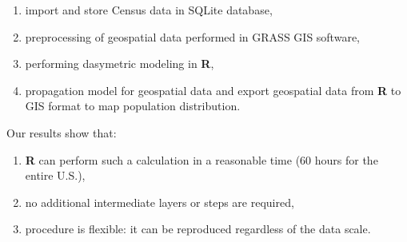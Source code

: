 \documentclass[11pt, a4paper]{article}
\providecommand{\tightlist}{%
  \setlength{\itemsep}{0pt}\setlength{\parskip}{0pt}}
\begin{document}
\begin{enumerate}
\def\labelenumi{\arabic{enumi}.}
\tightlist
\item
  import and store Census data in SQLite database,
\item
  preprocessing of geospatial data performed in GRASS GIS software,
\item
  performing dasymetric modeling in \textbf{R},
\item
  propagation model for geospatial data and export geospatial data from
  \textbf{R} to GIS format to map population distribution.
\end{enumerate}

Our results show that:

\begin{enumerate}
\def\labelenumi{\arabic{enumi}.}
\tightlist
\item
  \textbf{R} can perform such a calculation in a reasonable time (60
  hours for the entire U.S.),
\item
  no additional intermediate layers or steps are required,
\item
  procedure is flexible: it can be reproduced regardless of the data
  scale.
\end{enumerate}
\end{document}
